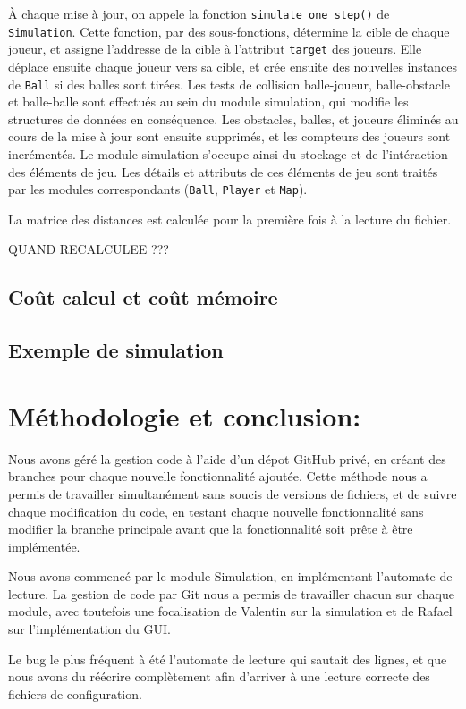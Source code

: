 \documentclass[a4paper, 11pt]{article}
\begin{document}
À chaque mise à jour, on appele la fonction \texttt{simulate\_one\_step()} de \texttt{Simulation}. Cette fonction, par des sous-fonctions, détermine la cible de chaque joueur, et assigne l'addresse de la cible à l'attribut \texttt{target} des joueurs. Elle déplace ensuite chaque joueur vers sa cible, et crée ensuite des nouvelles instances de \texttt{Ball} si des balles sont tirées. Les tests de collision balle-joueur, balle-obstacle et balle-balle sont effectués au sein du module simulation, qui modifie les structures de données en conséquence. Les obstacles, balles, et joueurs éliminés au cours de la mise à jour sont ensuite supprimés, et les compteurs des joueurs sont incrémentés. Le module simulation s'occupe ainsi du stockage et de l'intéraction des éléments de jeu. Les détails et attributs de ces éléments de jeu sont traités par les modules correspondants (\texttt{Ball}, \texttt{Player} et \texttt{Map}).

La matrice des distances est calculée pour la première fois à la lecture du fichier.

QUAND RECALCULEE ???

\subsection{Coût calcul et coût mémoire}

\subsection{Exemple de simulation}

\section{Méthodologie et conclusion:}

Nous avons géré la gestion code à l'aide d'un dépot GitHub privé, en créant des branches pour chaque nouvelle fonctionnalité ajoutée. Cette méthode nous a permis de travailler simultanément sans soucis de versions de fichiers, et de suivre chaque modification du code, en testant chaque nouvelle fonctionnalité sans modifier la branche principale avant que la fonctionnalité soit prête à être implémentée.

Nous avons commencé par le module Simulation, en implémentant l'automate de lecture. La gestion de code par Git nous a permis de travailler chacun sur chaque module, avec toutefois une focalisation de Valentin sur la simulation et de Rafael sur l'implémentation du GUI.

Le bug le plus fréquent à été l'automate de lecture qui sautait des lignes, et que nous avons du réécrire complètement afin d'arriver à une lecture correcte des fichiers de configuration.
\end{document}

